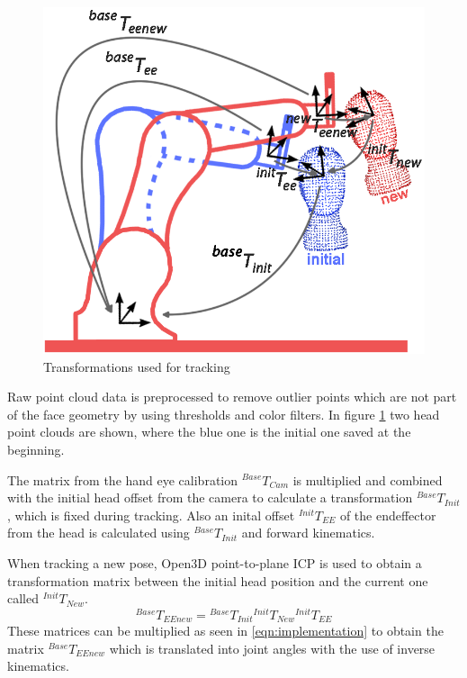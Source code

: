 \begin{figure}[ht]
	\centering
 	\includegraphics[width=\linewidth]{implementation2}
 	\caption{Transformations used for tracking}
 	\label{Implementation}
 \end{figure}

Raw point cloud data is preprocessed to remove outlier points which are not part of the face geometry by using thresholds and color filters. In figure \ref{Implementation} two head point clouds are shown, where the blue one is the initial one saved at the beginning.

The matrix from the hand eye calibration ${}^{Base}T_{Cam}$ is multiplied and combined with the initial head offset from the camera to calculate a transformation ${}^{Base}T_{Init}$, which is fixed during tracking. Also an inital offset ${}^{Init}T_{EE}$ of the endeffector from the head is calculated using ${}^{Base}T_{Init}$ and forward kinematics. 

When tracking a new pose, Open3D point-to-plane ICP is used to obtain a transformation matrix between the initial head position and the current one called ${}^{Init}T_{New}$. 
\begin{equation}
{}^{Base}T_{EEnew}={}^{Base}T_{Init} {}^{Init}T_{New} {}^{Init}T_{EE}
\label{eqn:implementation}
\end{equation}
These matrices can be multiplied as seen in \eqref{eqn:implementation} to obtain the matrix ${}^{Base}T_{EEnew}$ which is translated into joint angles with the use of inverse kinematics. 

